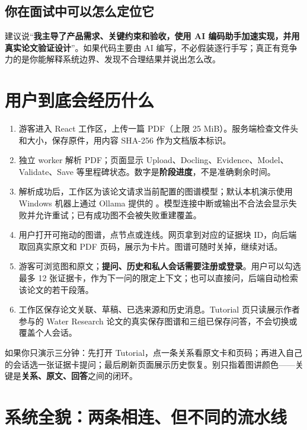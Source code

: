 \documentclass[UTF8,11pt,a4paper,fontset=fandol]{ctexart}
\newcommand{\code}[1]{\texttt{\footnotesize\detokenize{#1}}}
\newcommand{\term}[1]{\textbf{#1}}
\begin{document}
\subsection*{你在面试中可以怎么定位它}
建议说“\term{我主导了产品需求、关键约束和验收，使用 AI 编码助手加速实现，并用真实论文验证设计}”。如果代码主要由 AI 编写，不必假装逐行手写；真正有竞争力的是你能解释系统边界、发现不合理结果并说出怎么改。

\section{用户到底会经历什么}

\begin{enumerate}
\item 游客进入 React 工作区，上传一篇 PDF（上限 25 MiB）。服务端检查文件头和大小，保存原件，用内容 SHA-256 作为文档版本标识。
\item 独立 worker 解析 PDF；页面显示 Upload、Docling、Evidence、Model、Validate、Save 等里程碑状态。数字是\term{阶段进度}，不是准确剩余时间。
\item 解析成功后，工作区为该论文请求当前配置的图谱模型；默认本机演示使用 Windows 机器上通过 Ollama 提供的 \code{gpt-oss:20b}。模型连接中断或输出不合法会显示失败并允许重试；已有成功图不会被失败重建覆盖。
\item 用户打开可拖动的图谱，点节点或连线。网页拿到对应的证据块 ID，向后端取回真实原文和 PDF 页码，展示为卡片。图谱可随时关掉，继续对话。
\item 游客可浏览图和原文；\term{提问、历史和私人会话需要注册或登录}。用户可以勾选最多 12 张证据卡，作为下一问的限定上下文；也可以直接问，后端自动检索该论文的若干段落。
\item 工作区保存论文关联、草稿、已选来源和历史消息。Tutorial 页只读展示作者参与的 Water Research 论文的真实保存图谱和三组已保存问答，不会切换或覆盖个人会话。
\end{enumerate}

\begin{practicebox}
如果你只演示三分钟：先打开 Tutorial，点一条关系看原文卡和页码；再进入自己的会话选一张证据卡提问；最后刷新页面展示历史恢复。别只指着图讲颜色——关键是\term{关系、原文、回答}之间的闭环。
\end{practicebox}

\section{系统全貌：两条相连、但不同的流水线}
\end{document}
